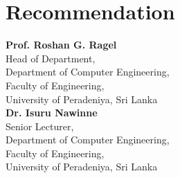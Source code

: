 \documentclass[letterpaper,11pt]{article}
\begin{document}
\section{Recommendation}
      \textbf{Prof. Roshan G. Ragel}\\
      \vspace{8pt}
      Head of Department,\\
      Department of Computer Engineering,\\
      Faculty of Engineering,\\
      University of Peradeniya, Sri Lanka\\
      \vspace{8pt}
      \textbf{Dr. Isuru Nawinne}\\
      \vspace{8pt}
      Senior Lecturer,\\
      Department of Computer Engineering,\\
      Faculty of Engineering,\\
      University of Peradeniya, Sri Lanka\\
\end{document}
